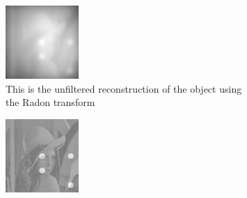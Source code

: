 \begin{figure}
  \centering
  \hfill
  \begin{subfigure}[t]{0.3\textwidth}
    \includegraphics[width=\textwidth]{Chapters/flopt/Figs/PDF/results/no_helix/iradon_nofilter}
    \caption[Unfiltered iRadon]{This is the unfiltered reconstruction of the object using the \gls{Radon transform}}%
    \label{fig:iradon_nofilter}
  \end{subfigure}\hfill
  \begin{subfigure}[t]{0.3\textwidth}
    \includegraphics[width=\textwidth]{Chapters/flopt/Figs/PDF/results/no_helix/iradon_filter}

\end{subfigure}
\end{figure}

